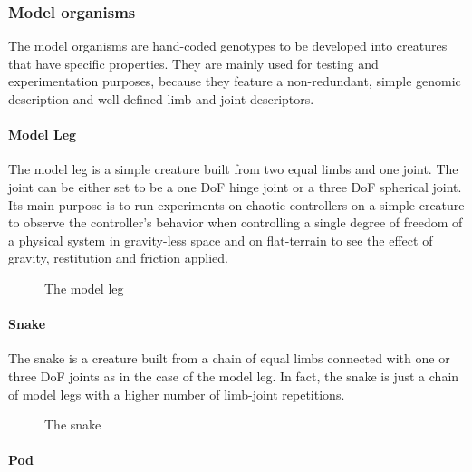 \documentclass[main]{subfiles}
\begin{document}

\subsubsection{Model organisms}

The model organisms are hand-coded genotypes to be developed into creatures that have specific properties. They are mainly used for testing and experimentation purposes, because they feature a non-redundant, simple genomic description and well defined limb and joint descriptors.

\paragraph{Model Leg}

The model leg is a simple creature built from two equal limbs and one joint. The joint can be either set to be a one DoF hinge joint or a three DoF spherical joint. Its main purpose is to run experiments on chaotic controllers on a simple creature to observe the controller's behavior when controlling a single degree of freedom of a physical system in gravity-less space and on flat-terrain to see the effect of gravity, restitution and friction applied.

\begin{figure}[!h]
\centering
{}
\caption{The model leg}
\label{figure:model-leg}
\end{figure}

\paragraph{Snake}

The snake is a creature built from a chain of equal limbs connected with one or three DoF joints as in the case of the model leg. In fact, the snake is just a chain of model legs with a higher number of limb-joint repetitions.

\begin{figure}[!h]
\centering
{}
\caption{The snake}
\label{figure:snake}
\end{figure}


\paragraph{Pod}
\end{document}
